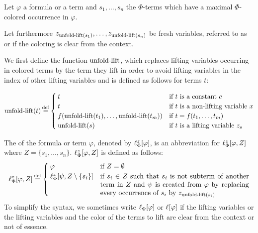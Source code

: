 \begin{defi}[Lifting]
\newcommand{\colterm}[1]{s_{#1}}
Let $\varphi$ a formula or a term and $\colterm{1}, \dotsc, \colterm{n}$ the $\Phi$-terms which have a maximal $\Phi$-colored occurrence in $\varphi$.

	Let furthermore $z_{\expa(\colterm{1})}, \ldots, z_{\expa(\colterm{n})}$ be fresh variables, referred to as  or  if the coloring is clear from the context.

	We first define the function $\operatorname{unfold-lift}$, which replaces lifting variables occurring in colored terms by the term they lift in order to avoid lifting variables in the index of other lifting variables and is defined as follows for terms $t$:
	\medskip

	\begin{adjustwidth}{-1.4em}{}
		\noindent $
		\expa(t) \defeq \begin{cases}
			t & \text{if $t$ is a constant $c$} \\
			t & \text{if $t$ is a non-lifting variable $x$} \\
			f(\expa(t_1),\dots, \expa(t_m)) & \text{if $t=f(t_1, \dots, t_m)$} \\
			\expa(s) & \text{if $t$ is a lifting variable $z_s$}
	\end{cases}
	$
	\end{adjustwidth}
	\medskip

	The  of the formula or term $\varphi$, denoted by $\ell_{\Phi}^{z}[\varphi]$, is an abbreviation for 
	$\ell_{\Phi}^{z}[\varphi, Z]$ where $Z = \{ \colterm{1}, \dotsc, \colterm{n} \}$.
		$\ell_{\Phi}^{z}[\varphi, Z]$ is defined as follows:
	\[
		\lifphi{\varphi, Z} \defeq
		\begin{cases}
			\varphi & \text{if $Z = \emptyset$} \\
			\lifphi{\psi, Z\setminus\{\colterm{i}\}} & \parbox[t]{0.622\linewidth}{if $\colterm{i} \in Z$ such that $s_i$ is not subterm of another term in $Z$ and $\psi$ is created from $\varphi$ by replacing every occurrence of $\colterm{i}$ by $z_{\expa(\colterm{i})}$} 
		\end{cases}
	\]
	To simplify the syntax, we sometimes write $\ell_{\Phi}[\varphi]$ or $\ell[\varphi]$ if the lifting variables or the lifting variables and the color of the terms to lift are clear from the context or not of essence.
\end{defi}

